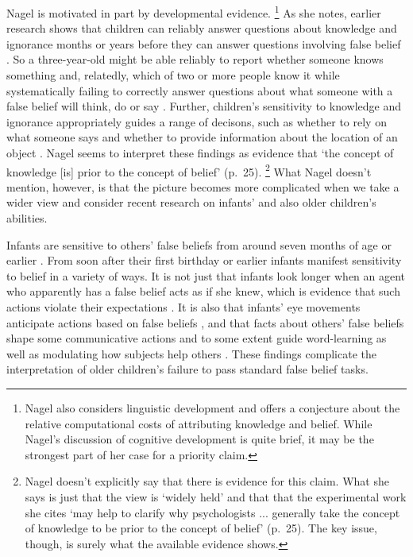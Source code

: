 \documentclass[11pt,a4paper]{extarticle}
\begin{document}
Nagel is motivated in part by developmental evidence.%
\footnote{
Nagel also considers linguistic development and offers a conjecture about the relative computational costs of attributing knowledge and belief.
While Nagel's discussion of cognitive development is quite brief, it may be the strongest part of her case for a priority claim.
}
As she notes, earlier research shows that
children can reliably answer questions about knowledge and ignorance months or years before they can answer questions involving false belief \citep{hogrefe_ignorance_1986}.
So a three-year-old might be able reliably to report whether someone knows something and, relatedly, which of two or more people know it while systematically failing to correctly answer questions about what someone with a false belief will think, do or say \citep{Wellman:2001lz}.
Further, children's sensitivity to knowledge and ignorance appropriately guides a range of decisons, 
such as whether to rely on what someone says \citep{Robinson:1999sq,Robinson:2003bh} 
and whether to provide information about the location of an object \citep{Dunham:2000tv,Liszkowski:2008al}.
Nagel seems to interpret these findings as evidence that `the concept of knowledge [is] prior to the concept of belief' (p.\ 25).%
\footnote{
Nagel doesn't explicitly say that there is evidence for this claim.
What she says is just that the view is `widely held' and that that the experimental work she cites `may help to clarify why psychologists ... generally take the concept of knowledge to be prior to the concept of belief' (p.\ 25).
The key issue, though, is surely what the available evidence shows.
} 
What Nagel doesn't mention, however, is that the picture becomes more complicated when we take a wider view and consider recent research on infants' and also older children's abilities.

Infants are sensitive to others' false beliefs from around seven months of age or earlier \citep{kovacs_social_2010}.
From soon after their first birthday or earlier infants manifest sensitivity to belief in a variety of ways.
It is not just that infants look longer when an agent who apparently has a false belief acts as if she knew, which is evidence that such actions violate their expectations  \citep{Onishi:2005hm,Surian:2007hl}.
It is also that infants' eye movements anticipate actions based on false beliefs \citep{Southgate:2007js},
and that facts about others' false beliefs shape some communicative actions \citep{Knudsen:2011fk} and to some extent guide word-learning \citep{Carpenter:2002gc} as well as modulating how subjects help others \citep{Buttelmann:2009gy}.
These findings complicate the interpretation of older children's failure to pass standard false belief tasks.
\end{document}
